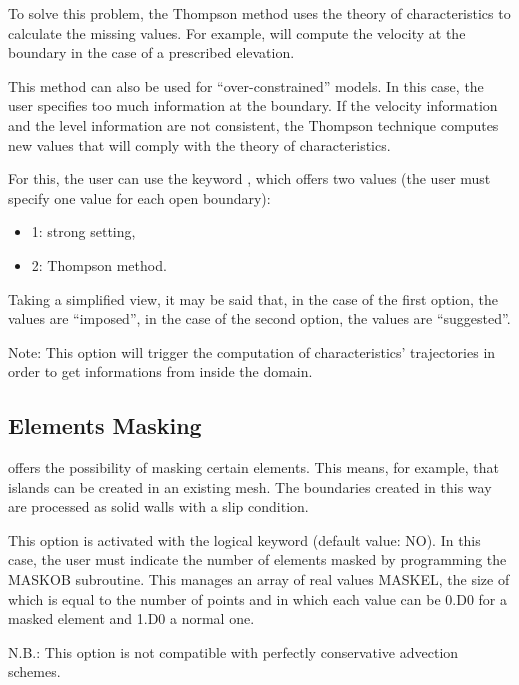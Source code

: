  To solve this problem, the Thompson method uses the theory of characteristics to calculate the missing values. For example,  will compute the velocity at the boundary in the case of a prescribed elevation.

 This method can also be used for ``over-constrained'' models. In this case, the user specifies too much information at the boundary. If the velocity information and the level information are not consistent, the Thompson technique computes new values that will comply with the theory of characteristics.

 For this, the user can use the keyword , which offers two values (the user must specify one value for each open boundary):

\begin{itemize}
\item [\nonumber] 1: strong setting,

\item [\nonumber] 2: Thompson method.
\end{itemize}

 Taking a simplified view, it may be said that, in the case of the first option, the values are ``imposed'', in the case of the second option, the values are ``suggested''.

\begin{WarningBlock}{Note:}
This option will trigger the computation of characteristics' trajectories in order to get informations from inside the domain.
\end{WarningBlock}

\subsection{ Elements Masking}

  offers the possibility of masking certain elements. This means, for example, that islands can be created in an existing mesh. The boundaries created in this way are processed as solid walls with a slip condition.

 This option is activated with the logical keyword  (default value: NO). In this case, the user must indicate the number of elements masked by programming the MASKOB subroutine. This manages an array of real values MASKEL, the size of which is equal to the number of points and in which each value can be 0.D0 for a masked element and 1.D0 a normal one.

 N.B.: This option is not compatible with perfectly conservative advection schemes.


